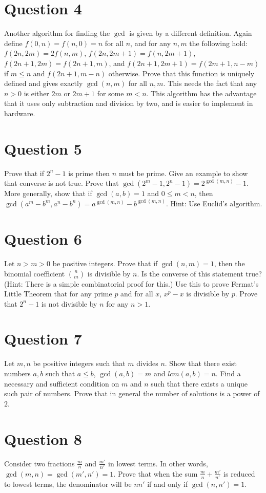 \documentclass[12pt]{report}
\begin{document}
\section*{Question 4}
Another algorithm for finding the $\gcd$ is given by a different definition. Again define $f(0, n) = f(n, 0) = n$ for all $n$, and for any $n, m$ the following hold: $f(2n, 2m) = 2f(n, m)$, $f(2n, 2m + 1) = f(n, 2m + 1)$, $f(2n + 1, 2m) = f(2n + 1, m)$, and $f(2n + 1, 2m + 1) = f(2m + 1, n - m)$ if $m \leq n$ and $f(2n + 1, m - n)$ otherwise. Prove that this function is uniquely defined and gives exactly $\gcd(n, m)$ for all $n, m$. This needs the fact that any $n > 0$ is either $2m$ or $2m + 1$ for some $m < n$. This algorithm has the advantage that it uses only subtraction and division by two, and is easier to implement in hardware.
\section*{Question 5}
Prove that if $2^{n} - 1$ is prime then $n$ must be prime. Give an example to show that converse is not true. Prove that $\gcd(2^{m} - 1, 2^{n} - 1) = 2^{\gcd(m, n)} - 1$. More generally, show that if $\gcd(a, b) = 1$ and $0 \leq m < n$, then $\gcd(a^m - b^m, a^n - b^n) = a^{\gcd(m, n)} - b^{\gcd(m, n)}$. Hint: Use Euclid's algorithm.
\section*{Question 6}
Let $n > m > 0$ be positive integers. Prove that if $\gcd(n, m) = 1$, then the binomial coefficient $\binom{n}{m}$ is divisible by $n$. Is the converse of this statement true? (Hint: There is a simple combinatorial proof for this.) Use this to prove Fermat's Little Theorem that for any prime $p$ and for all $x$, $x^{p} - x$ is divisible by $p$. Prove that $2^n - 1$ is not divisible by $n$ for any $n > 1$.
\section*{Question 7}
Let $m, n$ be positive integers such that $m$ divides $n$. Show that there exist numbers $a, b$ such that $a \leq b$, $\gcd(a, b) = m$ and $lcm(a, b) = n$. Find a necessary and sufficient condition on $m$ and $n$ such that there exists a unique such pair of numbers. Prove that in general the number of solutions is a power of $2$.
\section*{Question 8}
Consider two fractions $\frac{m}{n}$ and $\frac{m'}{n'}$ in lowest terms. In other words, $\gcd(m, n) = \gcd(m', n') = 1$. Prove that when the sum $\frac{m}{n} + \frac{m'}{n'}$ is reduced to lowest terms, the denominator will be $nn'$ if and only if $\gcd(n, n') = 1$.
\end{document}
